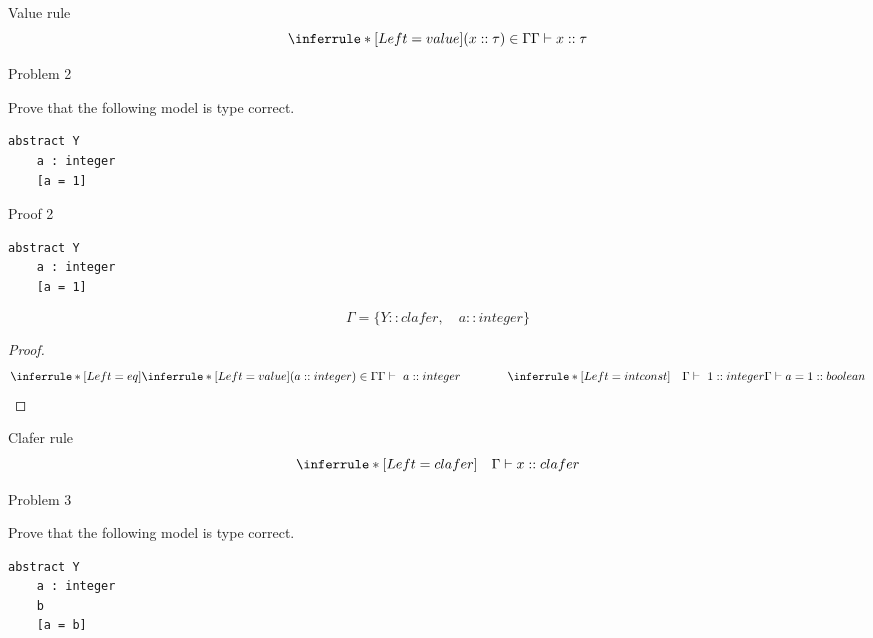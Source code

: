 \documentclass[table,15pt,t]{beamer}
\begin{document}
\begin{frame}[fragile,c]{Value rule}
\begin{equation*}
\inferrule* [Left=value] {(x::\tau)\in\Gamma}{\Gamma\vdash x::\tau}
\end{equation*}
\end{frame}

\begin{frame}[fragile,c]{Problem 2}

 Prove that the following model is type correct.

\vfill \begin{lstlisting}
abstract Y
    a : integer
    [a = 1]
\end{lstlisting}
\end{frame}

\begin{frame}[fragile,c]{Proof 2}
\begin{lstlisting}
abstract Y
    a : integer
    [a = 1]
\end{lstlisting}
\begin{equation*}
\Gamma = \{Y::clafer,\quad a::integer\}
\end{equation*}

\begin{proof}
\begin{equation*}
\inferrule* [Left=eq] {
  \inferrule* [Left=value]{(a::integer)\in\Gamma}{\Gamma\vdash\ a::integer} \\ \hspace{40pt} 
  \inferrule* [Left=intconst]{\quad}{\Gamma\vdash\ 1::integer}}
{\Gamma\vdash a = 1::boolean}
\end{equation*}
\end{proof}
\end{frame}

\begin{frame}[fragile,c]{Clafer rule}
\begin{equation*}
\inferrule* [Left=clafer] {\quad}{\Gamma\vdash x::clafer}
\end{equation*}
\end{frame}

\begin{frame}[fragile,c]{Problem 3}

 Prove that the following model is type correct.

\vfill \begin{lstlisting}
abstract Y
    a : integer
    b
    [a = b]
\end{lstlisting}
\end{frame}
\end{document}
